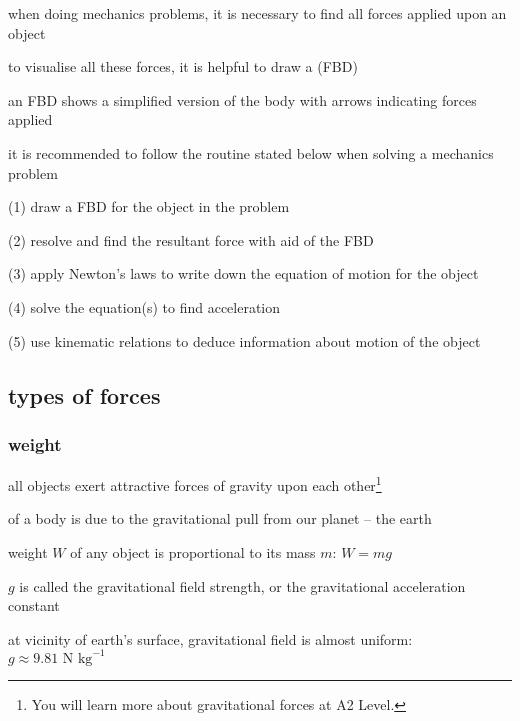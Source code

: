 when doing mechanics problems, it is necessary to find all forces applied upon an object

to visualise all these forces, it is helpful to draw a  (FBD)

an FBD shows a simplified version of the body with arrows indicating forces applied

\newpage

it is recommended to follow the routine stated below when solving a mechanics problem

\begin{compactitem}
	\item[(1)] draw a FBD for the object in the problem
	
	\item[(2)] resolve and find the resultant force with aid of the FBD
	
	\item[(3)] apply Newton's laws to write down the equation of motion for the object
	
	\item[(4)] solve the equation(s) to find acceleration
	
	\item[(5)] use kinematic relations to deduce information about motion of the object
\end{compactitem}



\subsection{types of forces}

\subsubsection{weight}\label{ch_weight}

all objects exert attractive forces of gravity upon each other\footnote{You will learn more about gravitational forces at A2 Level.}

 of a body is due to the gravitational pull from our planet -- the earth

weight $W$ of any object is proportional to its mass $m$: $\boxed{W=mg}$

$g$ is called the gravitational field strength, or the gravitational acceleration constant

\cmt at vicinity of earth's surface, gravitational field is almost uniform: $g \approx 9.81 \text{ N kg}^{-1}$

